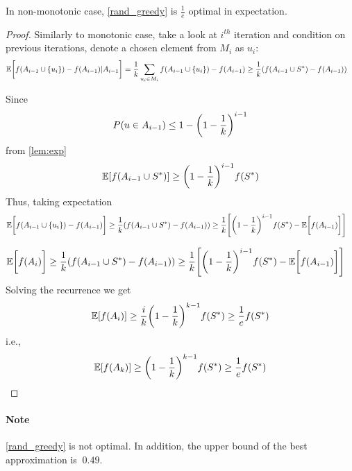 \begin{theorem}
	In non-monotonic case, \vref{rand_greedy} is $\frac{1}{e}$ optimal in expectation.
	\begin{proof}
		Similarly to monotonic case, take a look at $i^{th}$ iteration and condition on previous iterations, denote a chosen element from $M_i$ as $u_i$:
		\begin{align}
		\mathbb{E} \qty\bigg[f(A_{i-1} \cup \qty{u_i}) - f(A_{i-1}) | A_{i-1} ] &= \frac{1}{k} \sum_{u_i \in M_i} f(A_{i-1} \cup \qty{u_i}) - f(A_{i-1}) \geq \frac{1}{k} \qty(f(A_{i-1} \cup S^*) - f(A_{i-1}) )
		\end{align}
		
		
		Since
		\begin{align}
		P(u\in A_{i-1}) \leq 1 - \qty(1-\frac{1}{k})^{i-1}
		\end{align}
		from \vref{lem:exp}
		\begin{align}
		\mathbb{E}\qty[f(A_{i-1} \cup S^*)] \geq \qty(1-\frac{1}{k})^{i-1}f(S^*)
		\end{align}
		Thus, taking expectation		
		\begin{align}
		\mathbb{E} \qty\bigg[f(A_{i-1} \cup \qty{u_i}) - f(A_{i-1}) ] &\geq \frac{1}{k} \qty(f(A_{i-1} \cup S^*) - f(A_{i-1}) ) \geq \frac{1}{k}  \qty[\qty(1-\frac{1}{k})^{i-1}f(S^*) - \mathbb{E} \qty\bigg[f(A_{i-1})] ]
		\end{align}
			
		\begin{align}
		\mathbb{E} \qty\bigg[f(A_{i} )] &\geq \frac{1}{k} \qty(f(A_{i-1} \cup S^*) - f(A_{i-1}) ) \geq \frac{1}{k}  \qty[\qty(1-\frac{1}{k})^{i-1}f(S^*) - \mathbb{E} \qty\bigg[f(A_{i-1})] ]
		\end{align}
		Solving the recurrence we get
		\begin{align}
		\mathbb{E} \qty[f(A_i)] \geq \frac{i}{k} \qty(1-\frac{1}{k})^{k-1} f(S^*) \geq \frac{1}{e}f(S^*) 
		\end{align}
		i.e.,
		\begin{align}
		\mathbb{E} \qty[f(A_k)] \geq  \qty(1-\frac{1}{k})^{k-1} f(S^*) \geq \frac{1}{e}f(S^*) 
		\end{align}
		
		
	\end{proof}
\end{theorem}

\paragraph{Note} \vref{rand_greedy} is not optimal. In addition, the upper bound of the best approximation is $~0.49$.
